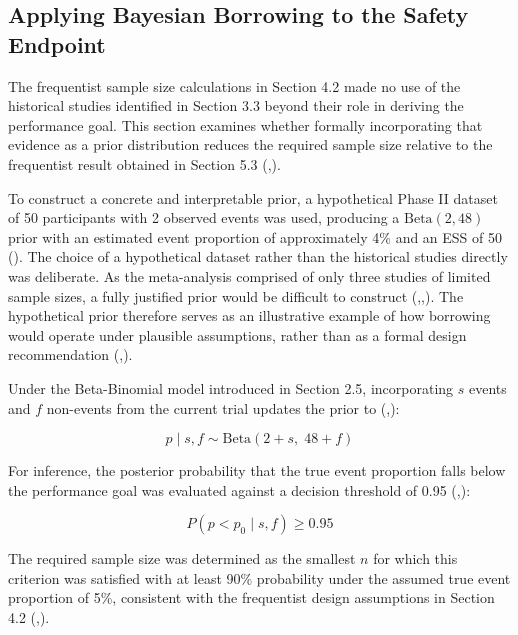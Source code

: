 \documentclass{article}
\begin{document}
\subsection{Applying Bayesian Borrowing to the Safety
Endpoint}\label{applying-bayesian-borrowing-to-the-safety-endpoint}

The frequentist sample size calculations in Section 4.2 made no use of
the historical studies identified in Section 3.3 beyond their role in
deriving the performance goal. This section examines whether formally
incorporating that evidence as a prior distribution reduces the required
sample size relative to the frequentist result obtained in Section 5.3
(,).

To construct a concrete and interpretable prior, a hypothetical Phase II
dataset of 50 participants with 2 observed events was used, producing a
\(\text{Beta}(2, 48)\) prior with an estimated event proportion of
approximately 4\% and an ESS of 50
(). The
choice of a hypothetical dataset rather than the historical studies
directly was deliberate. As the meta-analysis comprised of only three
studies of limited sample sizes, a fully justified prior would be
difficult to construct
(,,).
The hypothetical prior therefore serves as an illustrative example of
how borrowing would operate under plausible assumptions, rather than as
a formal design recommendation
(,).

Under the Beta-Binomial model introduced in Section 2.5, incorporating
\(s\) events and \(f\) non-events from the current trial updates the
prior to
(,):

\[p \mid s, f \sim \text{Beta}(2 + s,\; 48 + f)\]

For inference, the posterior probability that the true event proportion
falls below the performance goal was evaluated against a decision
threshold of 0.95
(,):

\[P(p < p_0 \mid s, f) \geq 0.95\]

The required sample size was determined as the smallest \(n\) for which
this criterion was satisfied with at least 90\% probability under the
assumed true event proportion of 5\%, consistent with the frequentist
design assumptions in Section 4.2
(,).
\end{document}
